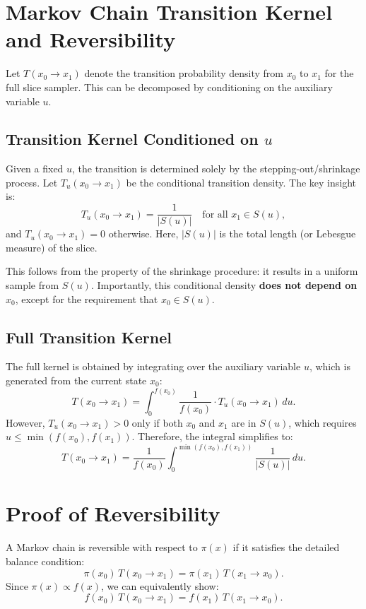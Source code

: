 \documentclass[12pt, oneside, paper=A4, DIV=15, BCOR=0mm, abstract=true, headings=small]{scrartcl}
\theoremstyle{customdef}
\begin{document}
\section{Markov Chain Transition Kernel and Reversibility}
Let \( T(x_0 \to x_1) \) denote the transition probability density from \( x_0 \) to \( x_1 \) for the full slice sampler. This can be decomposed by conditioning on the auxiliary variable \( u \).

\subsection{Transition Kernel Conditioned on \( u \)}
Given a fixed \( u \), the transition is determined solely by the stepping-out/shrinkage process. Let \( T_u(x_0 \to x_1) \) be the conditional transition density. The key insight is:
\[
T_u(x_0 \to x_1) = \frac{1}{|S(u)|} \quad \text{for all } x_1 \in S(u),
\]
and \( T_u(x_0 \to x_1) = 0 \) otherwise. Here, \( |S(u)| \) is the total length (or Lebesgue measure) of the slice.

This follows from the property of the shrinkage procedure: it results in a uniform sample from \( S(u) \). Importantly, this conditional density \textbf{does not depend on} \( x_0 \), except for the requirement that \( x_0 \in S(u) \).

\subsection{Full Transition Kernel}
The full kernel is obtained by integrating over the auxiliary variable \( u \), which is generated from the current state \( x_0 \):
\[
T(x_0 \to x_1) = \int_{0}^{f(x_0)} \frac{1}{f(x_0)} \cdot T_u(x_0 \to x_1) \, du.
\]
However, \( T_u(x_0 \to x_1) > 0 \) only if both \( x_0 \) and \( x_1 \) are in \( S(u) \), which requires \( u \le \min(f(x_0), f(x_1)) \). Therefore, the integral simplifies to:
\[
T(x_0 \to x_1) = \frac{1}{f(x_0)} \int_{0}^{\min(f(x_0), f(x_1))} \frac{1}{|S(u)|} \, du. \tag{1}
\]

\section{Proof of Reversibility}
A Markov chain is reversible with respect to \( \pi(x) \) if it satisfies the detailed balance condition:
\[
\pi(x_0) \, T(x_0 \to x_1) = \pi(x_1) \, T(x_1 \to x_0).
\]
Since \( \pi(x) \propto f(x) \), we can equivalently show:
\[
f(x_0) \, T(x_0 \to x_1) = f(x_1) \, T(x_1 \to x_0). \tag{2}
\]
\end{document}
